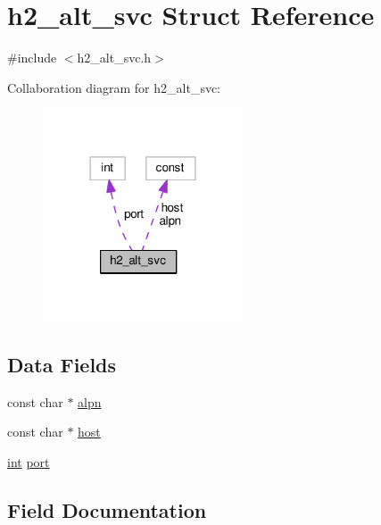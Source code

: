 \hypertarget{structh2__alt__svc}{}\section{h2\+\_\+alt\+\_\+svc Struct Reference}
\label{structh2__alt__svc}


{\ttfamily \#include $<$h2\+\_\+alt\+\_\+svc.\+h$>$}



Collaboration diagram for h2\+\_\+alt\+\_\+svc\+:
\nopagebreak
\begin{figure}[H]
\begin{center}
\leavevmode
\includegraphics[width=168pt]{structh2__alt__svc__coll__graph}
\end{center}
\end{figure}
\subsection*{Data Fields}
\begin{DoxyCompactItemize}
\item 
const char $\ast$ \hyperlink{structh2__alt__svc_a4251ac7b55f03e778ea7be11e3d006bc}{alpn}
\item 
const char $\ast$ \hyperlink{structh2__alt__svc_a3c9356bc046c3f6d41f4b7f9f6331e89}{host}
\item 
\hyperlink{pcre_8txt_a42dfa4ff673c82d8efe7144098fbc198}{int} \hyperlink{structh2__alt__svc_ad66fa5cd21dc292cf99ff80f1f7249a9}{port}
\end{DoxyCompactItemize}


\subsection{Field Documentation}
